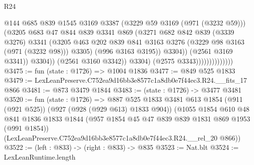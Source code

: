 \begin{lexlean}{R24}
\begin{coremodule}
                                          @144
                                          @685
                                          @839
                                          @1545
                                          @3169
                                          @3387
                                          (@3229 @59 @3169 (@971 (@3232 @59)))
                                          (@3205
                                            @683
                                            @47
                                            @844
                                            @839
                                            @3341
                                            @869
                                            (@3271
                                              @682
                                              @842
                                              @839
                                              (@3339 @3276)
                                              @3341
                                              (@3205
                                                @463
                                                @202
                                                @839
                                                @841
                                                @3163
                                                @3276
                                                (@3229 @98 @3163 (@971 (@3232 @98)))
                                                @3305)
                                              (@996 @3163 @3195))
                                            @3304))
                                        (@2561 @3169 @3341))
                                      @3304))
                                  (@2561 @3160 @3342))
                                @3304)
                              (@2575 @3343))))))))))))))
@3475 := fun (state : @1726) => @1004 @1836
@3477 := @849 @525 @1833
@3479 := LexLeanPreserve.C752ea9d16bb3e8577c1a8db0e7f44ec3.R24.__fits_17 @866
@3481 := @873 @3479 @1844
@3483 := (state : @1726) -> @3477 @3481
@3520 := fun (state : @1726) =>
  @887
    @525
    @1833
    @3481
    @613
    @1854
    (@911 (@921 @525))
    (@927 (@928 (@929 @613) @1833 @904))
    (@1055
      @1854
      @610
      @48
      @841
      @1836
      @1833
      @1844
      (@957 @1854 @45 @47 @839 @839 @1831 @869 @1953 (@991 @1854))
      (LexLeanPreserve.C752ea9d16bb3e8577c1a8db0e7f44ec3.R24.__rel_20 @866))
@3522 := (left : @833) -> (right : @833) -> @835
@3523 := Nat.blt
@3524 := LexLeanRuntime.length

\end{coremodule}
\end{lexlean}
